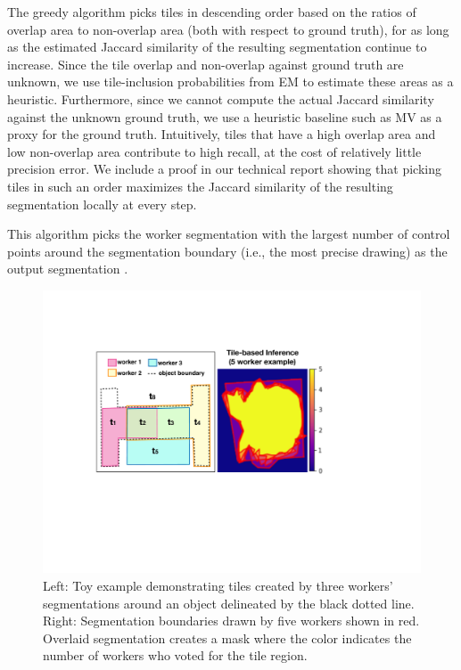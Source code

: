 \par \noindent The greedy algorithm picks tiles in descending order based on the ratios of overlap area to non-overlap area (both with respect to ground truth), for as long as the estimated Jaccard similarity of the resulting segmentation continue to increase. Since the tile overlap and non-overlap against ground truth are unknown, we use tile-inclusion probabilities from EM to estimate these areas as a heuristic. Furthermore, since we cannot compute the actual Jaccard similarity against the unknown ground truth, we use a heuristic baseline such as MV as a proxy for the ground truth. Intuitively, tiles that have a high overlap area and low non-overlap area contribute to high recall, at the cost of relatively little precision error. We include a proof in our technical report showing that picking tiles in such an order maximizes the Jaccard similarity of the resulting segmentation locally at every step. 

\par \noindent This algorithm picks the worker segmentation with the largest number of control points around the segmentation boundary (i.e., the most precise drawing) as the output segmentation \cite{Vittayakorn2011,Sorokin2008}.

\begin{figure}[h!]
\centering
\includegraphics[width=0.85\linewidth]{plots/tile.pdf}
\caption{Left: Toy example demonstrating tiles created by three workers' segmentations around an object delineated by the black dotted line. Right: Segmentation boundaries drawn by five workers shown in red. Overlaid segmentation creates a mask where the color indicates the number of workers who voted for the tile region.}
\label{tile_demo}
\setlength{\abovecaptionskip}{-15pt}
\setlength{\belowcaptionskip}{-25pt}
\end{figure}  